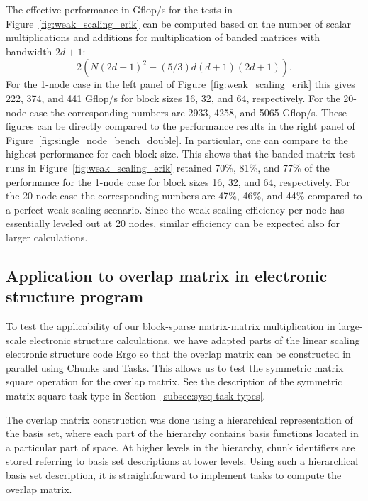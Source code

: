 \documentclass{elsarticle}
\begin{document}
The effective performance in Gflop/s for the tests in
Figure~\ref{fig:weak_scaling_erik} can be computed based on the number
of scalar multiplications and additions for multiplication of banded
matrices with bandwidth $2d+1$:
\begin{equation}
  2(N(2d+1)^2 - (5/3)d(d+1)(2d+1)).
\end{equation}
For the 1-node case in the left panel of
Figure~\ref{fig:weak_scaling_erik} this gives 222, 374, and 441
Gflop/s for block sizes 16, 32, and 64, respectively. For the 20-node
case the corresponding numbers are 2933, 4258, and 5065 Gflop/s.
These figures can be directly compared to the performance results in
the right panel of Figure~\ref{fig:single_node_bench_double}. In
particular, one can compare to the highest performance for each block
size.  This shows that the banded matrix test runs in
Figure~\ref{fig:weak_scaling_erik} retained 70\%, 81\%, and 77\% of
the performance for the 1-node case for block sizes 16, 32, and 64,
respectively. For the 20-node case the corresponding numbers are 47\%,
46\%, and 44\% compared to a perfect weak scaling scenario.  Since the
weak scaling efficiency per node has essentially leveled out at 20
nodes, similar efficiency can be expected also for larger
calculations.




\subsection{Application to overlap matrix in electronic structure program}\label{sec:smat-tests}


To test the applicability of our block-sparse matrix-matrix
multiplication in large-scale electronic structure calculations, we
have adapted parts of the linear scaling electronic structure code
{\sc Ergo} \cite{linmemDFT} so that the overlap matrix can be
constructed in parallel using Chunks and Tasks. This allows us to test
the symmetric matrix square operation for the overlap matrix. See the
description of the symmetric matrix square task type in
Section~\ref{subsec:sysq-task-types}.

The overlap matrix construction was done using a hierarchical
representation of the basis set, where each part of the hierarchy
contains basis functions located in a particular part of space. At
higher levels in the hierarchy, chunk identifiers are stored referring to basis set
descriptions at lower levels. Using such a hierarchical basis set
description, it is straightforward to implement tasks to compute the
overlap matrix.
\end{document}
